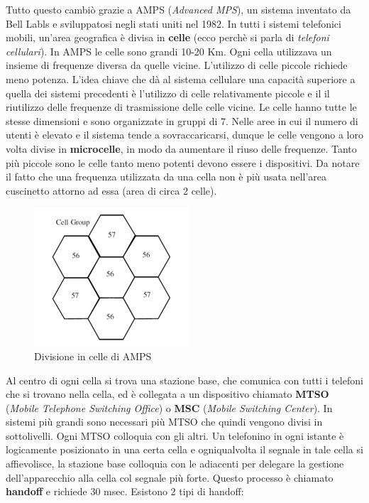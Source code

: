 Tutto questo cambiò grazie a AMPS (\textit{Advanced MPS}), un sistema inventato da Bell Labls e sviluppatosi negli stati uniti nel 1982. In tutti i sistemi telefonici mobili, un'area geografica è divisa in \textbf{celle} (ecco perchè si parla di \textit{telefoni cellulari}). In AMPS le celle sono grandi 10-20 Km. Ogni cella utilizzava un insieme di frequenze diversa da quelle vicine. L'utilizzo di celle piccole richiede meno potenza. L'idea chiave che dà al sistema cellulare una capacità superiore a quella dei sistemi precedenti è l'utilizzo di celle relativamente piccole e il il riutilizzo delle frequenze di trasmissione delle celle vicine. Le celle hanno tutte le stesse dimensioni e sono organizzate in gruppi di 7. Nelle aree in cui il numero di utenti è elevato e il sistema tende a sovraccaricarsi, dunque le celle vengono a loro volta divise in \textbf{microcelle}, in modo da aumentare il riuso delle frequenze. Tanto più piccole sono le celle tanto meno potenti devono essere i dispositivi. Da notare il fatto che una frequenza utilizzata da una cella non è più usata nell'area cuscinetto attorno ad essa (area di circa 2 celle).

\begin{figure}[htbp]
\centering
\includegraphics[scale=0.8]{images/amps_cells.png}
\caption{Divisione in celle di AMPS}
\end{figure}

Al centro di ogni cella si trova una stazione base, che comunica con tutti i telefoni che si trovano nella cella, ed è collegata a un dispositivo chiamato \textbf{MTSO} (\textit{Mobile Telephone Switching Office}) o \textbf{MSC} (\textit{Mobile Switching Center}). In sistemi più grandi sono necessari più MTSO che quindi vengono divisi in sottolivelli. Ogni MTSO colloquia con gli altri. Un telefonino in ogni istante è logicamente posizionato in una certa cella e ogniqualvolta il segnale in tale cella si affievolisce, la stazione base colloquia con le adiacenti per delegare la gestione dell'apparecchio alla cella col segnale più forte. Questo processo è chiamato \textbf{handoff} e richiede 30 msec. Esistono 2 tipi di handoff:

